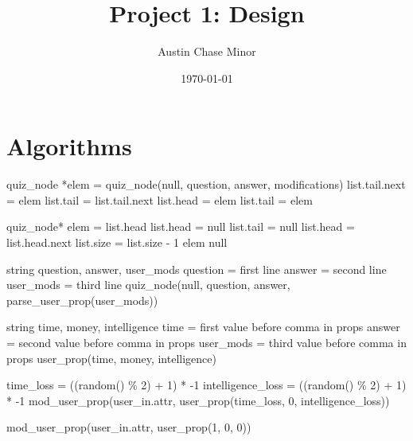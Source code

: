 \documentclass{article}
\title{Project 1: Design}
\author{Austin Chase Minor}
\date{\today}
\begin{document}
\maketitle

\section{Algorithms}
\begin{algorithmic}
  \State quiz\_node *elem = quiz\_node(null, question, answer, modifications)
    \State list.tail.next = elem
    \State list.tail = list.tail.next
  \Else
    \State list.head = elem
    \State list.tail = elem
  \EndIf
  \EndFunction
\end{algorithmic}
\begin{algorithmic}
    \State quiz\_node* elem = list.head
      \State list.head = null
      \State list.tail = null
    \Else
      \State list.head = list.head.next
      \State list.size = list.size - 1
    \EndIf
    \State \Return elem
  \Else
    \State \Return null
  \EndIf
  \EndFunction
\end{algorithmic}
\begin{algorithmic}
  \State string question, answer, user\_mods
  \State question = first line
  \State answer = second line
  \State user\_mods = third line
  \State \Return quiz\_node(null, question, answer, parse\_user\_prop(user\_mods))
  \EndFunction
\end{algorithmic}
\begin{algorithmic}
  \State string time, money, intelligence
  \State time = first value before comma in props
  \State answer = second value before comma in props
  \State user\_mods = third value before comma in props
  \State \Return user\_prop(time, money, intelligence)
  \EndFunction
\end{algorithmic}
\begin{algorithmic}
  \State time\_loss = ((random() \% 2) + 1) * -1
  \State intelligence\_loss = ((random() \% 2) + 1) * -1
  \State mod\_user\_prop(user\_in.attr, user\_prop(time\_loss, 0, intelligence\_loss))
  \EndFunction
\end{algorithmic}
\begin{algorithmic}
  \State mod\_user\_prop(user\_in.attr, user\_prop(1, 0, 0))
  \EndFunction
\end{algorithmic}
\end{document}
